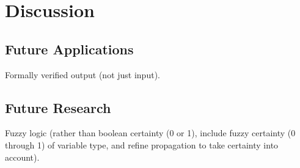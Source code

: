 
\section{Discussion}


\subsection{Future Applications}


Formally verified output (not just input).

\subsection{Future Research}


Fuzzy logic (rather than boolean certainty (0 or 1), include fuzzy certainty (0 through 1) of variable type, and refine propagation to take certainty into account).
